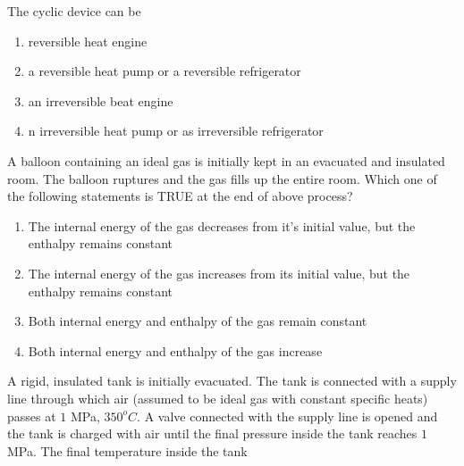     The cyclic device can be
    \begin{enumerate}
        \item  reversible heat engine
        \item a reversible heat pump or a reversible refrigerator
        \item an irreversible beat engine
        \item n irreversible heat pump or as irreversible refrigerator
    \end{enumerate}
    \item A balloon containing an ideal gas is initially kept in an evacuated and insulated room. The balloon ruptures and the gas fills up the entire room. Which one of the following statements is TRUE at the end of above process?
    \begin{enumerate}
        \item The internal energy of the gas decreases from it's initial value, but the enthalpy remains constant
        \item The internal energy of the gas increases from its initial value, but the enthalpy remains constant 
        \item Both internal energy and enthalpy of the gas remain constant
        \item Both internal energy and enthalpy of the gas increase
    \end{enumerate}

    \item A rigid, insulated tank is initially evacuated. The tank is connected with a supply line through which air (assumed to be ideal gas with constant specific heats) passes at $1$ MPa, $350^o C$. A valve connected with the supply line is opened and the tank is charged with air until the final pressure inside the tank reaches $1$ MPa. The final temperature inside the tank

    \begin{figure}[!ht]
\centering
{}%

\label{fig:my_label}
\end{figure}
    
